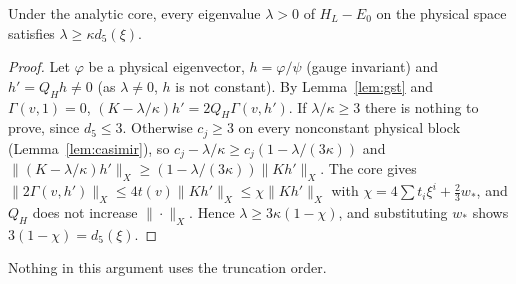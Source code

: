 \begin{proposition}\label{prop:return}
Under the analytic core, every eigenvalue $\lambda>0$ of $H_L-E_0$ on the physical space satisfies $\lambda\ge\kappa d_5(\xi)$.
\end{proposition}
\begin{proof}
Let $\varphi$ be a physical eigenvector, $h=\varphi/\psi$ (gauge invariant) and $h'=Q_Hh\neq0$ (as $\lambda\neq0$, $h$ is not constant). By Lemma~\ref{lem:gst} and $\Gamma(v,1)=0$, $(K-\lambda/\kappa)h'=2Q_H\Gamma(v,h')$. If $\lambda/\kappa\ge3$ there is nothing to prove, since $d_5\le3$. Otherwise $c_j\ge3$ on every nonconstant physical block (Lemma~\ref{lem:casimir}), so $c_j-\lambda/\kappa\ge c_j(1-\lambda/(3\kappa))$ and $\|(K-\lambda/\kappa)h'\|_X\ge(1-\lambda/(3\kappa))\|Kh'\|_X$. The core gives $\|2\Gamma(v,h')\|_X\le4t(v)\|Kh'\|_X\le\chi\|Kh'\|_X$ with $\chi=4\sum t_i\xi^i+\frac23w_*$, and $Q_H$ does not increase $\|\cdot\|_X$. Hence $\lambda\ge3\kappa(1-\chi)$, and substituting $w_*$ shows $3(1-\chi)=d_5(\xi)$.
\end{proof}

Nothing in this argument uses the truncation order.

